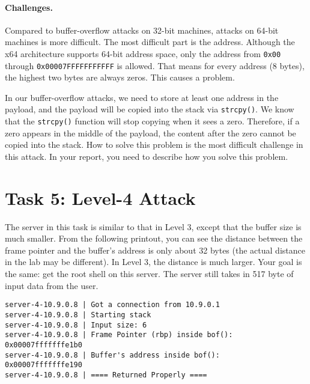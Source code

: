 \paragraph{Challenges.} Compared to buffer-overflow attacks on 32-bit 
machines, attacks on 64-bit machines is more difficult. The most 
difficult part is the address. Although the x64 architecture 
supports 64-bit address space, only the address from 
\texttt{0x00} through \texttt{0x00007FFFFFFFFFFF} is allowed. That means for 
every address (8 bytes), the highest two bytes are always zeros. 
This causes a problem.

In our buffer-overflow attacks, we need to store at least one address 
in the payload, and the payload will be copied into the stack via
\texttt{strcpy()}. We know that the \texttt{strcpy()} function
will stop copying when it sees a zero. Therefore, if a zero 
appears in the middle of the payload, the content after the 
zero cannot be copied into the stack. How to solve this 
problem is the most difficult challenge in this attack. In your 
report, you need to describe how you solve this problem. 




\section{Task 5: Level-4 Attack} 

The server in this task is similar to that in Level 3, 
except that the buffer size is much smaller. From the 
following printout, you can see the distance between 
the frame pointer and the buffer's address is only about 32 bytes (the 
actual distance in the lab may be different).
In Level 3, the distance is much larger. Your goal is the same: 
get the root shell on this server. The server still takes in
517 byte of input data from the user.


\begin{lstlisting}
server-4-10.9.0.8 | Got a connection from 10.9.0.1
server-4-10.9.0.8 | Starting stack
server-4-10.9.0.8 | Input size: 6
server-4-10.9.0.8 | Frame Pointer (rbp) inside bof():  0x00007fffffffe1b0
server-4-10.9.0.8 | Buffer's address inside bof():     0x00007fffffffe190
server-4-10.9.0.8 | ==== Returned Properly ====
\end{lstlisting}
 

